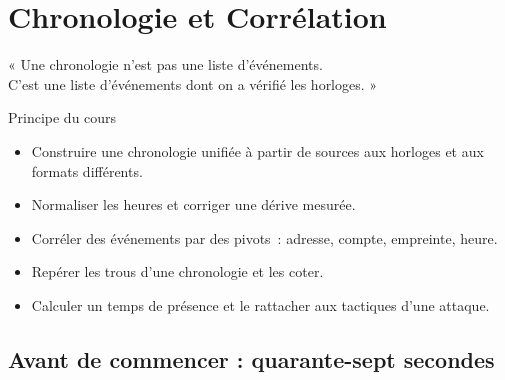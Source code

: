 
\chapter{Chronologie et Corrélation}
\label{chap:chronologie}

\epigraph{%
    « Une chronologie n'est pas une liste d'événements.\\
    C'est une liste d'événements dont on a vérifié les horloges. »%
}{Principe du cours}


\begin{boxobjectifs}
\begin{itemize}
    \item Construire une chronologie unifiée à partir de sources aux
          horloges et aux formats différents.
    \item Normaliser les heures et corriger une dérive mesurée.
    \item Corréler des événements par des pivots~: adresse, compte,
          empreinte, heure.
    \item Repérer les trous d'une chronologie et les coter.
    \item Calculer un temps de présence et le rattacher aux tactiques
          d'une attaque.
\end{itemize}
\end{boxobjectifs}

\bigskip

\section*{Avant de commencer : quarante-sept secondes}


